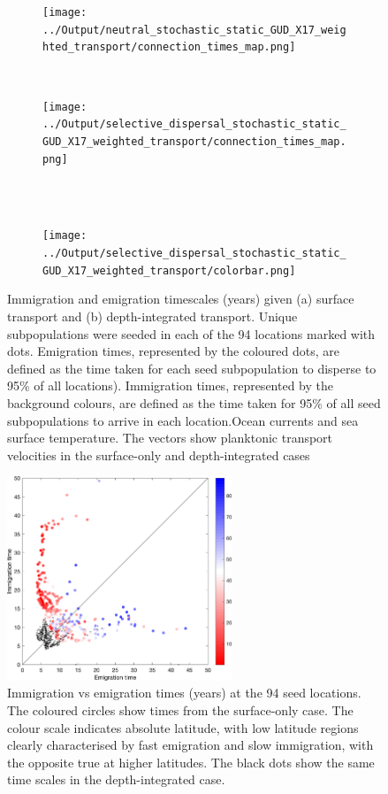 \documentclass[12pt]{article}
\begin{document}
\begin{figure}[htp]
        \centering
\begin{subfigure}{.66\textwidth}
        \centering
         \texttt{[image: ../Output/neutral\_stochastic\_static\_GUD\_X17\_weighted\_transport/connection\_times\_map.png]}
    \end{subfigure}%
    \\
\begin{subfigure}{.66\textwidth}
        \centering
         \texttt{[image: ../Output/selective\_dispersal\_stochastic\_static\_GUD\_X17\_weighted\_transport/connection\_times\_map.png]}
    \end{subfigure}%
    \\~\\
\begin{subfigure}{.66\textwidth}
        \centering
         \texttt{[image: ../Output/selective\_dispersal\_stochastic\_static\_GUD\_X17\_weighted\_transport/colorbar.png]}
    \end{subfigure}%
    \caption{Immigration and emigration timescales (years) given (a) surface transport and (b) depth-integrated transport. Unique subpopulations were seeded in each of the 94 locations marked with dots. Emigration times, represented by the coloured dots, are defined as the time taken for each seed subpopulation to disperse to 95\% of all locations). Immigration times, represented by the background colours, are defined as the time taken for 95\% of all seed subpopulations to arrive in each location.Ocean currents and sea surface temperature. The vectors show planktonic transport velocities in the surface-only and depth-integrated cases}
\label{Imm_vs_em}
\end{figure}


\begin{figure}[t!]
    \centering
        \includegraphics[width=0.6\textwidth]{../Figures/imm_vs_em.png}
    \caption{Immigration vs emigration times (years) at the 94 seed locations. The coloured circles show times from the surface-only case. The colour scale indicates absolute latitude, with low latitude regions clearly characterised by fast emigration and slow immigration, with the opposite true at higher latitudes. The black dots show the same time scales in the depth-integrated case.}
\label{Imm_vs_em}
\end{figure}
\end{document}
